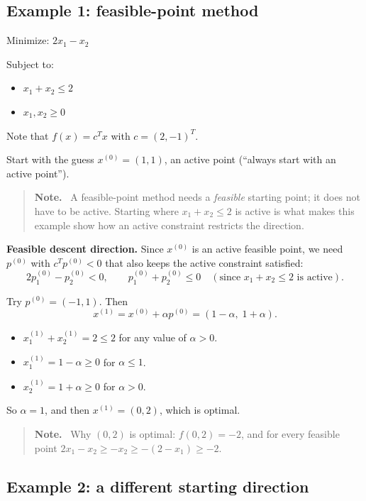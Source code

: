 \documentclass[11pt]{article}
\newenvironment{aside}{\begin{quote}\small\color{black!65}\textbf{Note.}\ }{\end{quote}}
\begin{document}
\subsection*{Example 1: feasible-point method}

Minimize: $2x_1 - x_2$

Subject to:
\begin{itemize}
    \item $x_1 + x_2 \le 2$
    \item $x_1, x_2 \ge 0$
\end{itemize}

Note that $f(x) = c^T x$ with $c = (2, -1)^T$.

Start with the guess $x^{(0)} = (1, 1)$, an active point (``always start with an
active point'').

\begin{aside}
A feasible-point method needs a \emph{feasible} starting point; it does not have
to be active. Starting where $x_1 + x_2 \le 2$ is active is what makes this
example show how an active constraint restricts the direction.
\end{aside}

\textbf{Feasible descent direction.} Since $x^{(0)}$ is an active feasible point, we
need $p^{(0)}$ with $c^T p^{(0)} < 0$ that also keeps the active constraint
satisfied:
\[
    2p_1^{(0)} - p_2^{(0)} < 0, \qquad p_1^{(0)} + p_2^{(0)} \le 0 \quad
    (\text{since } x_1 + x_2 \le 2 \text{ is active}).
\]

Try $p^{(0)} = (-1, 1)$. Then
\[
    x^{(1)} = x^{(0)} + \alpha p^{(0)} = (1 - \alpha,\; 1 + \alpha).
\]
\begin{itemize}
    \item $x_1^{(1)} + x_2^{(1)} = 2 \le 2$ for any value of $\alpha > 0$.
    \item $x_1^{(1)} = 1 - \alpha \ge 0$ for $\alpha \le 1$.
    \item $x_2^{(1)} = 1 + \alpha \ge 0$ for $\alpha > 0$.
\end{itemize}
So $\alpha = 1$, and then $x^{(1)} = (0, 2)$, which is optimal.

\begin{aside}
Why $(0,2)$ is optimal: $f(0,2) = -2$, and for every feasible point
$2x_1 - x_2 \ge -x_2 \ge -(2 - x_1) \ge -2$.
\end{aside}

\subsection*{Example 2: a different starting direction}
\end{document}
